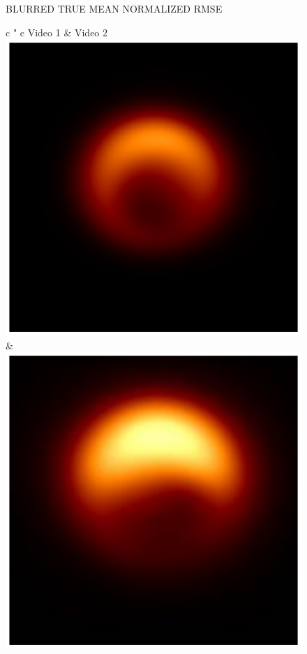 \begin{figure}
	\begin{center}
		\setlength{\tabcolsep}{3pt}
		
		\hspace{-0.5in}\normalsize{\textsf{BLURRED TRUE MEAN}}  \hspace{5.5cm} \normalsize{\textsf{NORMALIZED RMSE}} 
		\vspace{0.1in}
		
		
						\begin{tabular}{ c " c}
							\hspace{-.06in} \textsf{Video 1} & \hspace{-.06in} \textsf{Video 2} \\
							{{\includegraphics[height=.1\linewidth]{figures/starwarps_results/rotation30/gt/pavgImg_blurredbeam75_noaxis.pdf}} } & {{\includegraphics[height=.1\linewidth]{figures/starwarps_results/hotspot100sR2/gt/pavgImg_blurredbeam75_noaxis.pdf}} } \\ \thickhline

\end{tabular}
\end{center}
\end{figure}
